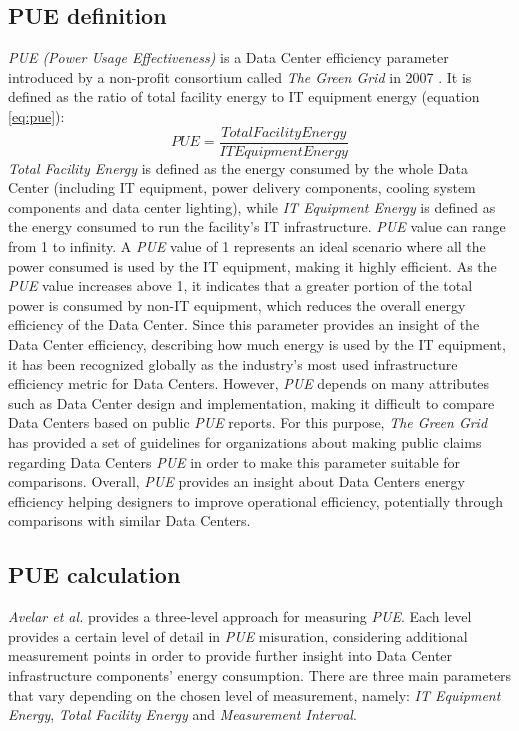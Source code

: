 \subsection{PUE definition}
\emph{PUE (Power Usage Effectiveness)} is a Data Center efficiency parameter introduced by a non-profit consortium called \emph{The Green Grid} in 2007 \cite{avelar2012pue}. It is defined as the ratio of total facility energy to IT equipment energy (equation \ref{eq:pue}):
\begin{equation} \label{eq:pue}
    PUE = \frac{Total Facility Energy}{IT Equipment Energy}
\end{equation}
\emph{Total Facility Energy} is defined as the energy consumed by the whole Data Center (including IT equipment, power delivery components, cooling system components and data center lighting), while \emph{IT Equipment Energy} is defined as the energy consumed to run the facility's IT infrastructure. \emph{PUE} value can range from 1 to infinity. A \emph{PUE} value of 1 represents an ideal scenario where all the power consumed is used by the IT equipment, making it highly efficient. As the \emph{PUE} value increases above 1, it indicates that a greater portion of the total power is consumed by non-IT equipment, which reduces the overall energy efficiency of the Data Center. Since this parameter provides an insight of the Data Center efficiency, describing how much energy is used by the IT equipment, it has been recognized globally as the industry's most used infrastructure efficiency metric for Data Centers. However, \emph{PUE} depends on many attributes such as Data Center design and implementation, making it difficult to compare Data Centers based on public \emph{PUE} reports. For this purpose, \emph{The Green Grid} has provided a set of guidelines for organizations about making public claims regarding Data Centers \emph{PUE} in order to make this parameter suitable for comparisons. Overall, \emph{PUE} provides an insight about Data Centers energy efficiency helping designers to improve operational efficiency, potentially through comparisons with similar Data Centers. 

\subsection{PUE calculation} \label{subsection:puecalculation}
\emph{Avelar et al.} \cite{avelar2012pue} provides a three-level approach for measuring \emph{PUE}. Each level provides a certain level of detail in \emph{PUE} misuration, considering additional measurement points in order to provide further insight into Data Center infrastructure components' energy consumption. There are three main parameters that vary depending on the chosen level of measurement, namely: \emph{IT Equipment Energy}, \emph{Total Facility Energy} and \emph{Measurement Interval}. 

